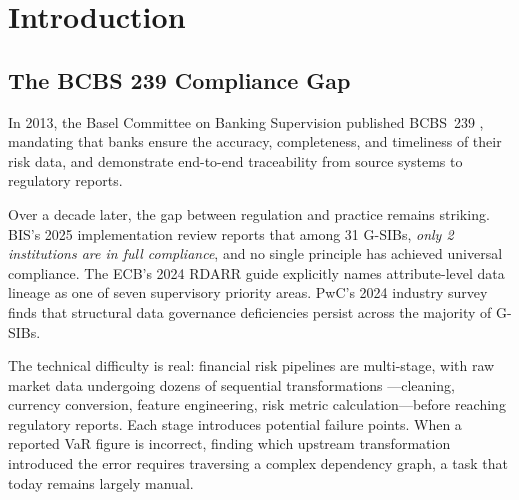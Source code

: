 \documentclass{article}
\begin{document}
\section{Introduction}
\label{sec:intro}

\subsection{The BCBS 239 Compliance Gap}

In 2013, the Basel Committee on Banking Supervision published BCBS~239
\cite{bis2013bcbs239}, mandating that banks ensure the accuracy,
completeness, and timeliness of their risk data, and demonstrate end-to-end
traceability from source systems to regulatory reports.

Over a decade later, the gap between regulation and practice remains striking.
BIS's 2025 implementation review \cite{bis2025review} reports that among 31
G-SIBs, \emph{only 2 institutions are in full compliance}, and no single
principle has achieved universal compliance.
The ECB's 2024 RDARR guide \cite{ecb2024rdarr} explicitly names
attribute-level data lineage as one of seven supervisory priority areas.
PwC's 2024 industry survey \cite{pwc2024bcbs} finds that structural data
governance deficiencies persist across the majority of G-SIBs.

The technical difficulty is real: financial risk pipelines are multi-stage,
with raw market data undergoing dozens of sequential transformations
---cleaning, currency conversion, feature engineering, risk metric
calculation---before reaching regulatory reports.
Each stage introduces potential failure points.
When a reported VaR figure is incorrect, finding which upstream transformation
introduced the error requires traversing a complex dependency graph, a task
that today remains largely manual.
\end{document}
